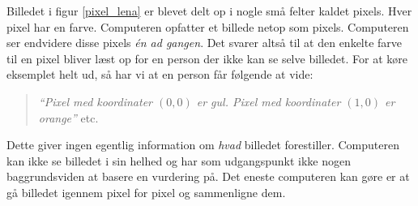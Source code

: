 {Billedet i figur \ref{pixel_lena} er blevet delt op i nogle små felter
kaldet pixels. Hver pixel har en farve. Computeren opfatter et billede
netop som pixels. Computeren ser endvidere disse pixels \emph{én ad
gangen}. Det svarer altså til at den enkelte farve til en pixel bliver
læst op for en person der ikke kan se selve billedet. For at køre
eksemplet helt ud, så har vi at en person får følgende at vide:
\begin{quote}
    \emph{``Pixel med koordinater $(0, 0)$ er gul. Pixel med
    koordinater $(1, 0)$ er orange''} etc.
\end{quote}
Dette giver ingen egentlig information om \emph{hvad} billedet
forestiller. Computeren kan ikke se billedet i sin helhed og har som
udgangspunkt ikke nogen baggrundsviden at basere en vurdering på. Det
eneste computeren kan gøre er at gå billedet igennem pixel for pixel og
sammenligne dem.

}

